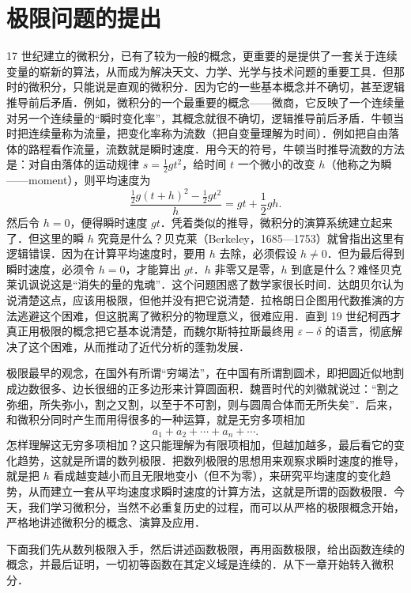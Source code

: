 \section{极限问题的提出}\label{sec:3.1}

17 世纪建立的微积分，已有了较为一般的概念，更重要的是提供了一套关于连续变量的崭新的算法，从而成为解决天文、力学、光学与技术问题的重要工具．但那时的微积分，只能说是直观的微积分．因为它的一些基本概念并不确切，甚至逻辑推导前后矛盾．例如，微积分的一个最重要的概念——微商，它反映了一个连续量对另一个连续量的``瞬时变化率''，其概念就很不确切，逻辑推导前后矛盾．牛顿当时把连续量称为流量，把变化率称为流数（把自变量理解为时间）．例如把自由落体的路程看作流量，流数就是瞬时速度．用今天的符号，牛顿当时推导流数的方法是：对自由落体的运动规律 $s = \frac{1}{2}gt^2$，给时间 $t$ 一个微小的改变 $h$（他称之为瞬——moment），则平均速度为
\[
\frac{\frac{1}{2}g(t+h)^2-\frac{1}{2}gt^2}{h} = gt + \frac{1}{2}gh.
\]
然后令 $h=0$，便得瞬时速度 $gt$．凭着类似的推导，微积分的演算系统建立起来了．但这里的瞬 $h$ 究竟是什么？贝克莱（Berkeley，1685---1753）就曾指出这里有逻辑错误．因为在计算平均速度时，要用 $h$ 去除，必须假设 $h \neq 0$．但为最后得到瞬时速度，必须令 $h=0$，才能算出 $gt$．$h$ 非零又是零，$h$ 到底是什么？难怪贝克莱讥讽说这是``消失的量的鬼魂''．这个问题困惑了数学家很长时间．达朗贝尔认为说清楚这点，应该用极限，但他并没有把它说清楚．拉格朗日企图用代数推演的方法逃避这个困难，但这脱离了微积分的物理意义，很难应用．直到 19 世纪柯西才真正用极限的概念把它基本说清楚，而魏尔斯特拉斯最终用 $\varepsilon - \delta$ 的语言，彻底解决了这个困难，从而推动了近代分析的蓬勃发展．

极限最早的观念，在国外有所谓``穷竭法''，在中国有所谓割圆术，即把圆近似地割成边数很多、边长很细的正多边形来计算圆面积．魏晋时代的刘徽就说过：``割之弥细，所失弥小，割之又割，以至于不可割，则与圆周合体而无所失矣''．后来，和微积分同时产生而用得很多的一种运算，就是无穷多项相加
\[
a_1 + a_2 + \cdots + a_n + \cdots.
\]
怎样理解这无穷多项相加？这只能理解为有限项相加，但越加越多，最后看它的变化趋势，这就是所谓的数列极限．把数列极限的思想用来观察求瞬时速度的推导，就是把 $h$ 看成越变越小而且无限地变小（但不为零），来研究平均速度的变化趋势，从而建立一套从平均速度求瞬时速度的计算方法，这就是所谓的函数极限．今天，我们学习微积分，当然不必重复历史的过程，而可以从严格的极限概念开始，严格地讲述微积分的概念、演算及应用．

下面我们先从数列极限入手，然后讲述函数极限，再用函数极限，给出函数连续的概念，并最后证明，一切初等函数在其定义域是连续的．从下一章开始转入微积分．
